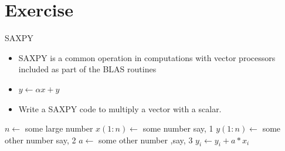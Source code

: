 \documentclass[10pt,t]{beamer}
\begin{document}
\section{Exercise}
\begin{frame}{SAXPY}
  \begin{itemize}
    \item SAXPY is a common operation in computations with vector processors included as part of the BLAS routines
    \item[] $y\leftarrow \alpha x + y$
    \item Write a SAXPY code to multiply a vector with a scalar.
  \end{itemize}
  \begin{algorithm}[H]
    \caption{Pseudo Code for SAXPY}
    \begin{algorithmic}
      \State $n \gets$ some large number
      \State $x(1:n) \gets$ some number say, 1
      \State $y(1:n) \gets$ some other number say, 2
      \State $a \gets$ some other number ,say, 3
      \State $y_i \gets y_i + a * x_i$
      \EndDo
    \end{algorithmic}
  \end{algorithm}
\end{frame}
\end{document}
